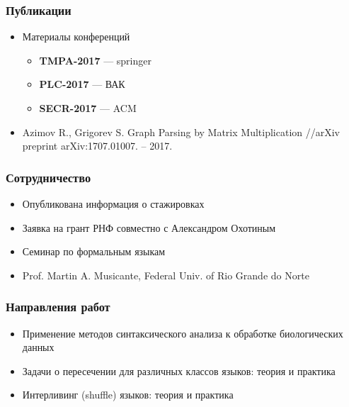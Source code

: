 \documentclass[xcolor=table]{beamer}
\begin{document}
\begin{frame}[fragile]
  \transwipe[direction=90]
  \frametitle{Публикации}
\begin{itemize}
      \item Материалы конференций
        \begin{itemize}
          \item \textbf{TMPA-2017} --- springer
          \item \textbf{PLC-2017} --- ВАК
          \item \textbf{SECR-2017} --- ACM
        \end{itemize}
      \item Azimov R., Grigorev S. Graph Parsing by Matrix Multiplication //arXiv preprint arXiv:1707.01007. – 2017.
\end{itemize}
\end{frame}

\begin{frame}[fragile]
  \transwipe[direction=90]
  \frametitle{Сотрудничество}
\begin{itemize}
      \item Опубликована информация о стажировках
      \item Заявка на грант РНФ совместно с Александром Охотиным
      \item Семинар по формальным языкам
      \item Prof. Martin A. Musicante, Federal Univ. of Rio Grande do Norte
\end{itemize}
\end{frame}

\begin{frame}[fragile]
  \transwipe[direction=90]
  \frametitle{Направления работ}
\begin{itemize}
      \item Применение методов синтаксического анализа к обработке биологических данных
      \item Задачи о пересечении для различных классов языков: теория и практика
      \item Интерливинг (shuffle) языков: теория и практика 
\end{itemize}
\end{frame}
\end{document}
